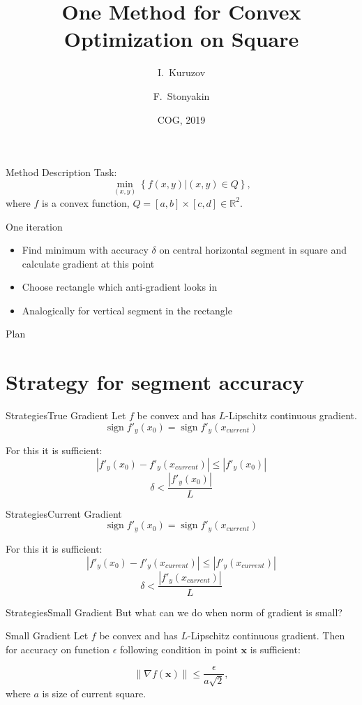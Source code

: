 \documentclass{beamer}
\title{One Method for Convex Optimization on Square}
\author{I.~Kuruzov\inst{1} \and F.~Stonyakin\inst{1, 2}}
\institute[MIPT] %
{
  \inst{1}%
Moscow Institute of Physics and Technology
  \and
  \inst{2}%
V.I.Vernadsky Crimean Federal University}
\date{COG, 2019}
\DeclareMathOperator{\sign}{sign}
\begin{document}
\begin{frame}
  \titlepage
\end{frame}


\begin{frame}{Method Description}
Task:
$$\min_{(x,y)}\left\{f(x,y)|(x,y) \in Q\right\},$$
where $f$ is a convex function, $Q = [a,b]\times[c, d]\in \mathbb{R}^2$.

\begin{block}{One iteration}
\begin{itemize}
\item{Find minimum with accuracy $\delta$ on central horizontal segment in square and calculate gradient at this point\pause}
\item{Choose rectangle which anti-gradient looks in\pause}
\item{Analogically for vertical segment in the rectangle}
\end{itemize}
\end{block}
\end{frame}

\begin{frame}{Plan}
  \tableofcontents
\end{frame}


\section{Strategy for segment accuracy}


\begin{frame}{Strategies}{True Gradient}
Let $f$ be convex and has $L$-Lipschitz continuous gradient.
    $$\sign f'_y(x_0) = \sign f'_y(x_{current})$$
    
For this it is sufficient:
    $$|f'_y(x_0) - f'_y(x_{current})| \leq |f'_y(x_0)|$$
	\pause
  $$\boxed{\delta < \frac{|f'_y(x_{0})|}{L}}$$
\end{frame}

\begin{frame}{Strategies}{Current Gradient}
    $$\sign f'_y(x_0) = \sign f'_y(x_{current})$$
    
For this it is sufficient:
    $$|f'_y(x_0) - f'_y(x_{current})| \leq |f'_y(x_{current})|$$
	\pause
  $$\boxed{\delta < \frac{|f'_y(x_{current})|}{L}}$$
\end{frame}

\begin{frame}{Strategies}{Small Gradient}
But what can we do when norm of gradient is small?

\pause
\begin{block}{Small Gradient}
Let $f$ be convex and has $L$-Lipschitz continuous gradient. Then for accuracy on function $\epsilon$ following condition in point $\textbf{x}$ is sufficient:

$$\|\nabla f(\textbf{x})\|\leq \frac{\epsilon}{a\sqrt{2}}, $$
where $a$ is size of current square.
\end{block}
\end{frame}
\end{document}
